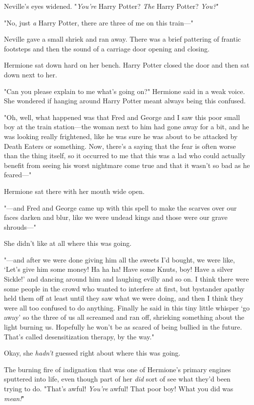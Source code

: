 Neville's eyes widened. "\emph{You're} Harry Potter? \emph{The} Harry Potter?
\emph{You?}"

"No, just \emph{a} Harry Potter, there are three of me on this train\mbox{---}"

Neville gave a small shriek and ran away. There was a brief pattering of
frantic footsteps and then the sound of a carriage door opening and closing.

Hermione sat down hard on her bench. Harry Potter closed the door and then sat
down next to her.

"Can you please explain to me what's going on?" Hermione said in a weak voice.
She wondered if hanging around Harry Potter meant always being this confused.

"Oh, well, what happened was that Fred and George and I saw this poor small boy
at the train station---the woman next to him had gone away for a bit, and he
was looking really frightened, like he was sure he was about to be attacked by
Death Eaters or something. Now, there's a saying that the fear is often worse
than the thing itself, so it occurred to me that this was a lad who could
actually benefit from seeing his worst nightmare come true and that it wasn't
so bad as he feared\mbox{---}"

Hermione sat there with her mouth wide open.

"---and Fred and George came up with this spell to make the scarves over our
faces darken and blur, like we were undead kings and those were our grave
shrouds\mbox{---}"

She didn't like at all where this was going.

"---and after we were done giving him all the sweets I'd bought, we were like,
`Let's give him some money! Ha ha ha! Have some Knuts, boy! Have a silver
Sickle!' and dancing around him and laughing evilly and so on. I think there
were some people in the crowd who wanted to interfere at first, but bystander
apathy held them off at least until they saw what we were doing, and then I
think they were all too confused to do anything. Finally he said in this tiny
little whisper `go away' so the three of us all screamed and ran off, shrieking
something about the light burning us. Hopefully he won't be as scared of being
bullied in the future. That's called desensitization therapy, by the way."

Okay, she \emph{hadn't} guessed right about where this was going.

The burning fire of indignation that was one of Hermione's primary engines
sputtered into life, even though part of her \emph{did} sort of see what they'd
been trying to do. "That's awful! \emph{You're} awful! That poor boy! What you
did was \emph{mean!}"


